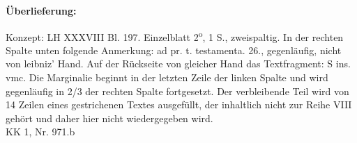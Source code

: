      
               
                \begin{ledgroupsized}[r]{120mm}
                \footnotesize 
                \pstart                
                \noindent\textbf{\"{U}berlieferung:}   
                \pend
                \end{ledgroupsized}
            
              
                            \begin{ledgroupsized}[r]{114mm}
                            \footnotesize 
                            \pstart \parindent -6mm
                            Konzept: LH XXXVIII Bl. 197. Einzelblatt 2\textsuperscript{o}, 1 S., zweispaltig. In der rechten Spalte unten folgende Anmerkung: ad pr. t. testamenta. 26., gegenl\"{a}ufig, nicht von leibniz' Hand. Auf der R\"{u}ckseite von gleicher Hand das Textfragment: S ins. vmc. Die Marginalie beginnt in der letzten Zeile der linken Spalte und wird gegenl\"{a}ufig in 2/3 der rechten Spalte fortgesetzt. Der verbleibende Teil wird von 14 Zeilen eines gestrichenen Textes ausgef\"{u}llt, der inhaltlich nicht zur Reihe VIII geh\"{o}rt und daher hier nicht wiedergegeben wird.\\KK 1, Nr. 971.b \pend
                            \end{ledgroupsized}
                \vspace*{8mm}
                \pstart 
                \normalsize
